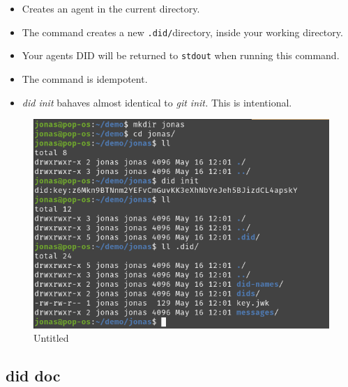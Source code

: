 \begin{itemize}
\tightlist
\item
  Creates an agent in the current directory.
\item
  The command creates a new \lstinline!.did/!directory,
  inside your working directory.
\item
  Your agents DID will be returned to \lstinline!stdout!
  when running this command.
\item
  The command is idempotent.
\item
  \emph{did init} bahaves almost identical to \emph{git init.} This is
  intentional.
\end{itemize}

\begin{figure}
\centering
\includegraphics{User Interface f8759a9462b24d5f95cf6123d68b89ea/Untitled 1.png}
\caption{Untitled}
\end{figure}

\hypertarget{did-doc}{%
\subsection{did doc}\label{did-doc}}

